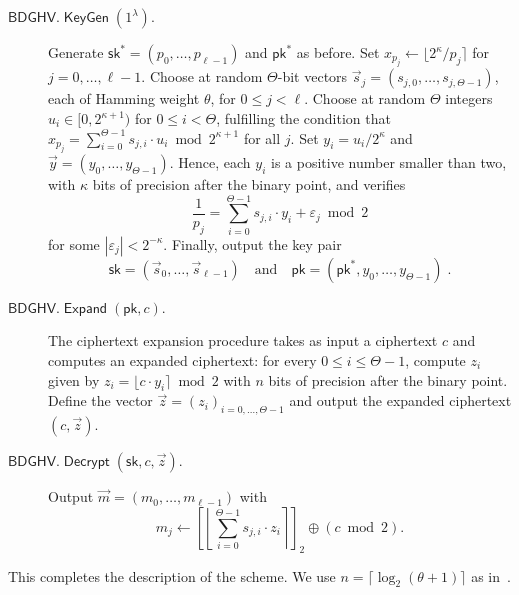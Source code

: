 \documentclass[11pt]{llncs}
\renewcommand\leq\leqslant
\newcommand{\abs}[1]{\left|#1\right|}
\DeclareMathOperator{\KeyGen}{\ensuremath{\mathsf{KeyGen}}}
\DeclareMathOperator{\Expand}{\ensuremath{\mathsf{Expand}}}
\DeclareMathOperator{\Decrypt}{\ensuremath{\mathsf{Decrypt}}}
\newcommand*{\pk}{\ensuremath{\mathsf{pk}}}
\newcommand*{\sk}{\ensuremath{\mathsf{sk}}}
\newcommand*{\BDGHV}{\ensuremath{\mathsf{BDGHV}}}
\newcommand\ignore[1]{}
\begin{document}
\begin{description}
\item[$\BDGHV.\KeyGen(1^\lambda)$.] Generate
  $\sk^*=(p_0,\ldots,p_{\ell-1})$ and $\pk^*$ as before. Set $x_{p_j}
  \leftarrow \lfloor 2^\kappa/p_j\rceil$ for
  $j=0,\ldots,{\ell-1}$. Choose at random 
  $\Theta$-bit vectors $\vec s_j=(s_{j,0},\ldots,s_{j,\Theta-1})$,
  each of Hamming weight $\theta$, for $0 \leq j < \ell$.
Choose at random $\Theta$ integers $u_i\in[0, 2^{\kappa+1})$ for $0
  \leq i <\Theta$, fulfilling the condition that
$
x_{p_j}=\sum_{i=0}^{\Theta-1}
s_{j,i} \cdot u_{i} \bmod 2^{\kappa+1}$ for all $j$.
Set $y_i=u_i/2^\kappa$ and $\vec y=(y_0,\ldots,y_{\Theta-1})$. Hence,
each $y_i$ is a positive number smaller than two, with $\kappa$ bits
of precision after the binary point, and verifies 
\begin{equation}
\label{eqpj}
\frac{1}{p_j}=\sum_{i=0}^{\Theta-1}
s_{j,i} \cdot y_{i} + \varepsilon_j \bmod 2
\end{equation}
for some $\abs{\varepsilon_j}<2^{-\kappa}$. Finally, output the key pair
$$\sk=(\vec s_0,\ldots,\vec s_{\ell-1}) \quad \text{and} \quad \pk = (\pk^*, y_0, \ldots, y_{\Theta-1})\;.$$
\item[$\BDGHV.\Expand(\pk, c)$.] The ciphertext expansion procedure takes
  as input a ciphertext $c$ and computes an expanded
  ciphertext: for every $0\leq i\leq \Theta-1$, compute $z_i$ given by
$ z_i = \lfloor c\cdot y_i\rceil \bmod 2 $
with $n$ bits of precision after the binary point. Define the vector $\vec z=(z_i)_{i=0,\ldots,\Theta-1}$ and output the expanded ciphertext $(c, \vec z)$.
\\\vspace{-0.25cm}
\item[$\BDGHV.\Decrypt(\sk, c, \vec z)$.] Output $\vec
  m=(m_0,\ldots,m_{\ell-1})$ with 
\begin{equation}
\label{eq:decrypt}
m_j \leftarrow\left[\left\lfloor\sum_{i=0}^{\Theta-1}
s_{j,i} \cdot z_{i}\right\rceil\right]_2 \oplus
(c \bmod 2). 
\end{equation}
\end{description}
This completes the description of the scheme. 
We
use $n=\lceil \log_2 (\theta+1) \rceil$ as in~\cite{CMNT2011}.\ignore{; the
proof of the following Lemma is  the same as in~\cite[Appendix~E]{CMNT2011}.

\begin{lemma}The BDGHV encryption scheme is correct for the set $C(\mathcal {P_E})$ of
  circuits that compute permitted polynomials.\end{lemma} 

\begin{remark}
To reduce the size of the public key we can generate all the $y_i$'s
pseudo-randomly as in~\cite{CMNT2011},  
except $\ell$ of them in order to satisfy Equation~\eqref{eqpj} for
all $0 \leq j < \ell$.
\end{remark}
}
\end{document}
